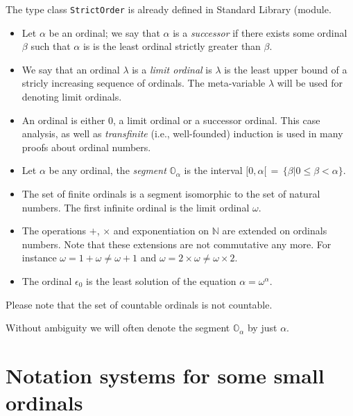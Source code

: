 The type class \texttt{StrictOrder} is already defined in Standard Library
(module.





\begin{itemize}
\item Let  $\alpha$ be an ordinal; we say that  $\alpha$ is a \emph{successor} if there exists some ordinal  $\beta$ such that 
$\alpha$ is is the least ordinal strictly greater than  $\beta$.

\item We say that an ordinal $\lambda$ is a \emph{limit ordinal} is $\lambda$  is the least upper bound of a stricly increasing sequence of ordinals.
The meta-variable $\lambda$ will be used for denoting  limit ordinals.

\item {}
An ordinal is either $0$, a limit ordinal or a successor ordinal. This case analysis, as well as \emph{transfinite} ({i.e.}, well-founded) induction is used in many proofs about ordinal numbers.

\item Let $\alpha$ be any ordinal, the \emph{segment} $\mathbb{O}_\alpha$ is the
interval $[0,\alpha[\,=\,\{\beta|0\leq\beta<\alpha\}$. 

\item The set  of finite ordinals is a segment isomorphic to the set of natural numbers.
 The first infinite ordinal is the limit ordinal $\omega$.
 
\item The operations $+$, $\times$ and exponentiation on $\mathbb{N}$ are extended on ordinals numbers. Note that these  extensions are not commutative any more.  For instance $\omega = 1 + \omega \not= \omega + 1$
and $\omega = 2 \times \omega \not= \omega \times 2$.

\item The ordinal $\epsilon_0$ is the least solution of the equation
 \(\alpha=\omega^{\alpha}\).
\end{itemize}


Please note that the set of countable ordinals is not countable. 

Without ambiguity we will often denote the segment $\mathbb{O}_\alpha$ by just $\alpha$.
 






\section{Notation systems for some small ordinals}

